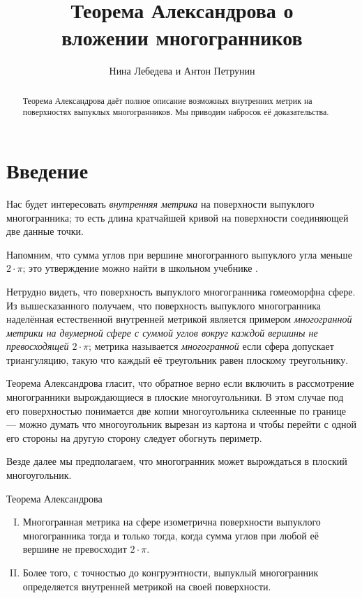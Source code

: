 \documentclass[oneside,a4paper]{article}
\begin{document}

\title{Теорема Александрова о\\ вложении многогранников}
\author{Нина Лебедева и Антон Петрунин}
\date{}
\maketitle

\begin{abstract}
Теорема Александрова даёт полное описание возможных внутренних метрик на поверхностях выпуклых многогранников.
Мы приводим набросок её доказательства.
\end{abstract}

\section{Введение}

Нас будет интересовать \emph{внутренняя метрика} на поверхности выпуклого многогранника;
то есть длина кратчайшей кривой на поверхности соединяющей две данные точки.

Напомним, что сумма углов при вершине многогранного выпуклого угла меньше $2\cdot \pi$; 
это утверждение можно найти в школьном учебнике \cite[§~325]{kiselyov}.

Нетрудно видеть, что поверхность выпуклого многогранника гомеоморфна сфере.
Из вышесказанного получаем, что поверхность выпуклого многогранника наделённая естественной внутренней метрикой
является примером \emph{многогранной метрики на двумерной сфере с суммой углов вокруг каждой вершины не превосходящей $2\cdot\pi$}; 
метрика называется \emph{многогранной} если сфера допускает триангуляцию, 
такую что каждый её треугольник равен плоскому треугольнику.

Теорема Александрова гласит, что обратное верно если включить в рассмотрение многогранники вырождающиеся в плоские многоугольники.
В этом случае под его поверхностью понимается две копии многоугольника склеенные по границе
--- можно думать что многоугольник вырезан из картона и чтобы перейти с одной его стороны на другую сторону следует обогнуть периметр.

Везде далее мы предполагаем, что многогранник может вырождаться в плоский многоугольник.

\begin{thm}{Теорема Александрова}
\begin{enumerate}[I.]
\item\label{thm:exist} Многогранная метрика на сфере изометрична поверхности выпуклого многогранника тогда и только тогда, когда сумма углов при любой её вершине не превосходит $2\cdot\pi$.

\item\label{thm:unique}
Более того, с точностью до конгруэнтности, выпуклый многогранник определяется внутренней метрикой на своей поверхности.
\end{enumerate}

\end{thm}
\end{document}

